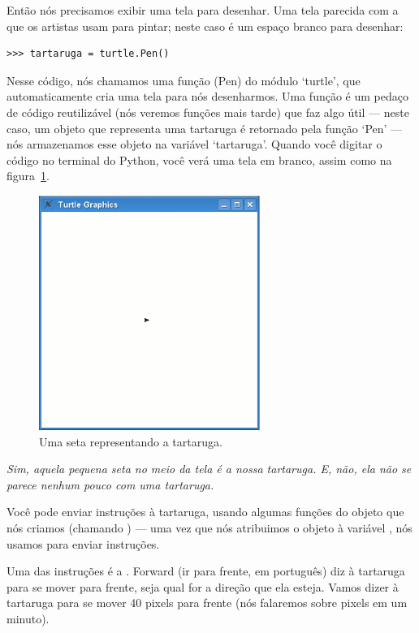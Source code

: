 Então nós precisamos exibir uma tela para desenhar. Uma tela parecida com a que os artistas usam para pintar; neste caso é um espaço branco para desenhar:

\begin{listing}
\begin{verbatim}
>>> tartaruga = turtle.Pen()
\end{verbatim}
\end{listing}

Nesse código, nós chamamos uma função (Pen) do módulo `turtle', que automaticamente cria uma tela para nós desenharmos. Uma função é um pedaço de código reutilizável (nós veremos funções mais tarde) que faz algo útil --- neste caso, um objeto que representa uma tartaruga é retornado pela função `Pen' --- nós armazenamos esse objeto na variável `tartaruga'. Quando você digitar o código no terminal do Python, você verá uma tela em branco, assim como na figura~\ref{fig10}.

\begin{figure}
\begin{center}
\includegraphics[width=72mm]{eps/figure10.eps}
\end{center}
\caption{Uma seta representando a tartaruga.}\label{fig10}
\end{figure}

\emph{Sim, aquela pequena seta no meio da tela é a nossa tartaruga. E, não, ela não se parece nenhum pouco com uma tartaruga.}

Você pode enviar instruções à tartaruga, usando algumas funções do objeto que nós criamos (chamando ) --- uma vez que nós atribuimos o objeto à variável , nós usamos  para enviar instruções.

Uma das instruções é a . Forward (ir para frente, em português) diz à tartaruga para se mover para frente, seja qual for a direção que ela esteja. Vamos dizer à tartaruga para se mover 40 pixels para frente (nós falaremos sobre pixels em um minuto).

